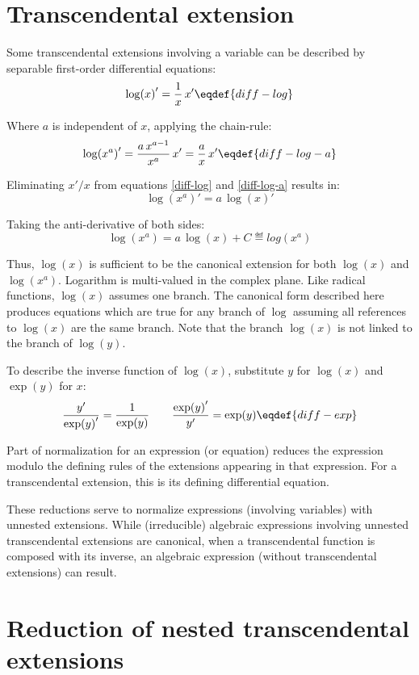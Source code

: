 \section{Transcendental extension}

Some transcendental extensions involving a variable can be
described by separable first-order differential equations:
$${{\log(x)}'}={1\over x}\,{x'}\eqdef{diff-log}$$

Where $a$ is independent of $x$, applying the chain-rule:
$${{\log(x^a)}'}={a\,x^{a-1}\over x^a}\,{x'}={a\over x}\,{x'}\eqdef{diff-log-a}$$

Eliminating $x'/x$ from equations \eqref{diff-log} and \eqref{diff-log-a}
results in:
$${{\log(x^a)}'}=a\,{{\log(x)}'}$$

Taking the anti-derivative of both sides:
$$\log(x^a)=a\,\log(x)+C\eqdef{log(x^a)}$$

Thus, $\log(x)$ is sufficient to be the canonical extension for both
$\log(x)$ and $\log(x^a)$.  Logarithm is multi-valued in the complex
plane.  Like radical functions, $\log(x)$ assumes one branch.  The
canonical form described here produces equations which are true for
any branch of $\log$ assuming all references to $\log(x)$ are the same
branch.  Note that the branch $\log(x)$ is not linked to the
branch of $\log(y)$.

To describe the inverse function of $\log(x)$, substitute $y$ for
$\log(x)$ and $\exp(y)$ for $x$:
$${{y}'\over {\exp(y)}'}={1\over\exp(y)}\qquad{{\exp(y)}'\over {y}'}=\exp(y)\eqdef{diff-exp}$$

Part of normalization for an expression (or equation) reduces the
expression modulo the defining rules of the extensions appearing in
that expression.  For a transcendental extension, this is its
defining differential equation.

These reductions serve to normalize expressions (involving variables)
with unnested extensions.  While (irreducible) algebraic expressions
involving unnested transcendental extensions are canonical, when a
transcendental function is composed with its inverse, an algebraic
expression (without transcendental extensions) can result.

\section{Reduction of nested transcendental extensions}

